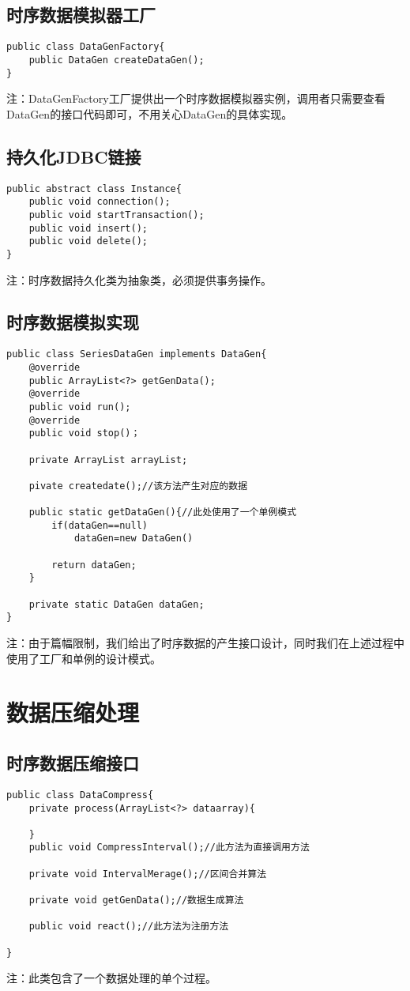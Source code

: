 \subsection{时序数据模拟器工厂}
\begin{lstlisting}
public class DataGenFactory{
	public DataGen createDataGen();
}
\end{lstlisting}
注：DataGenFactory工厂提供出一个时序数据模拟器实例，调用者只需要查看DataGen的接口代码即可，不用关心DataGen的具体实现。


\subsection{持久化JDBC链接}
\begin{lstlisting}
public abstract class Instance{
	public void connection();
	public void startTransaction();
	public void insert();
	public void delete();
}
\end{lstlisting}
注：时序数据持久化类为抽象类，必须提供事务操作。

\subsection{时序数据模拟实现}
\begin{lstlisting}
public class SeriesDataGen implements DataGen{
	@override
	public ArrayList<?> getGenData();
	@override
	public void run();
	@override
	public void stop()；

	private ArrayList arrayList;

	pivate createdate();//该方法产生对应的数据

	public static getDataGen(){//此处使用了一个单例模式
		if(dataGen==null)
			dataGen=new DataGen()
		
		return dataGen;
	}

	private static DataGen dataGen;
}
\end{lstlisting}
注：由于篇幅限制，我们给出了时序数据的产生接口设计，同时我们在上述过程中使用了工厂和单例的设计模式。




\section{数据压缩处理}
\label{4.5}

\subsection{时序数据压缩接口}
\begin{lstlisting}
public class DataCompress{
	private process(ArrayList<?> dataarray){

	}
	public void CompressInterval();//此方法为直接调用方法

	private void IntervalMerage();//区间合并算法

	private void getGenData();//数据生成算法

	public void react();//此方法为注册方法

}
\end{lstlisting}
注：此类包含了一个数据处理的单个过程。


